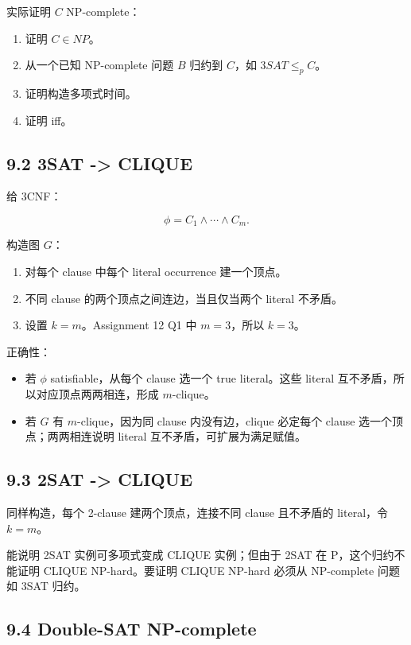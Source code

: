 ﻿\documentclass[UTF8,11pt]{ctexart}
\begin{document}
实际证明 \(C\) NP-complete：


\begin{enumerate}
\item 证明 \(C\in NP\)。
\item 从一个已知 NP-complete 问题 \(B\) 归约到 \(C\)，如 \(3SAT\le_p C\)。
\item 证明构造多项式时间。
\item 证明 iff。
\end{enumerate}


\subsection{9.2 3SAT -> CLIQUE}


给 3CNF：

\[
\phi=C_1\wedge\cdots\wedge C_m.
\]

构造图 \(G\)：


\begin{enumerate}
\item 对每个 clause 中每个 literal occurrence 建一个顶点。
\item 不同 clause 的两个顶点之间连边，当且仅当两个 literal 不矛盾。
\item 设置 \(k=m\)。Assignment 12 Q1 中 \(m=3\)，所以 \(k=3\)。
\end{enumerate}


正确性：


\begin{itemize}
\item 若 \(\phi\) satisfiable，从每个 clause 选一个 true literal。这些 literal 互不矛盾，所以对应顶点两两相连，形成 \(m\)-clique。
\item 若 \(G\) 有 \(m\)-clique，因为同 clause 内没有边，clique 必定每个 clause 选一个顶点；两两相连说明 literal 互不矛盾，可扩展为满足赋值。
\end{itemize}


\subsection{9.3 2SAT -> CLIQUE}


同样构造，每个 2-clause 建两个顶点，连接不同 clause 且不矛盾的 literal，令 \(k=m\)。  

能说明 2SAT 实例可多项式变成 CLIQUE 实例；但由于 2SAT 在 P，这个归约不能证明 CLIQUE NP-hard。要证明 CLIQUE NP-hard 必须从 NP-complete 问题如 3SAT 归约。


\subsection{9.4 Double-SAT NP-complete}
\end{document}
